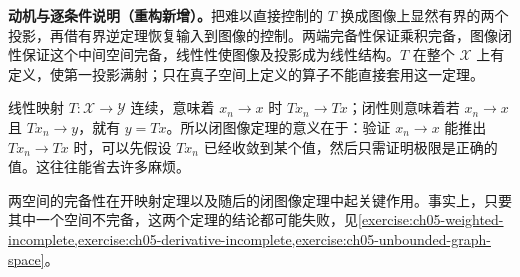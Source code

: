 \documentclass[../../main.tex]{subfiles}
\begin{document}
\begin{remark}
\textbf{动机与逐条件说明（重构新增）。}把难以直接控制的 $T$ 换成图像上显然有界的两个投影，再借有界逆定理恢复输入到图像的控制。两端完备性保证乘积完备，图像闭性保证这个中间空间完备，线性性使图像及投影成为线性结构。$T$ 在整个 $\mathcal X$ 上有定义，使第一投影满射；只在真子空间上定义的算子不能直接套用这一定理。
\end{remark}
线性映射 $T:\mathcal X\to\mathcal Y$ 连续，意味着 $x_n\to x$ 时 $Tx_n\to Tx$；闭性则意味着若 $x_n\to x$ 且 $Tx_n\to y$，就有 $y=Tx$。所以闭图像定理的意义在于：验证 $x_n\to x$ 能推出 $Tx_n\to Tx$ 时，可以先假设 $Tx_n$ 已经收敛到某个值，然后只需证明极限是正确的值。这往往能省去许多麻烦。

两空间的完备性在开映射定理以及随后的闭图像定理中起关键作用。事实上，只要其中一个空间不完备，这两个定理的结论都可能失败，见\cref{exercise:ch05-weighted-incomplete,exercise:ch05-derivative-incomplete,exercise:ch05-unbounded-graph-space}。
\end{document}
